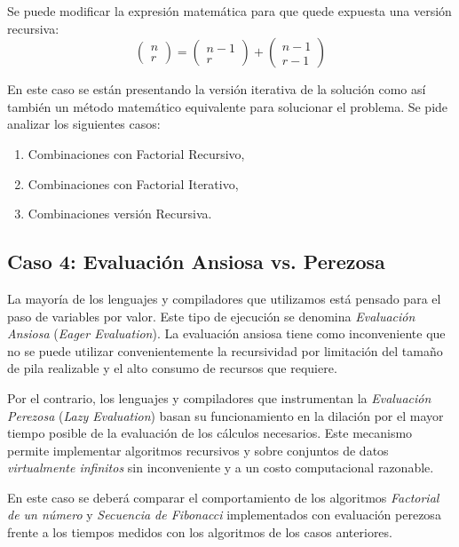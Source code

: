 Se puede modificar la expresión matemática para que quede expuesta una versión
recursiva:
\begin{equation*}
    \begin{pmatrix} n \\ r \end{pmatrix} =
    \begin{pmatrix}
        n - 1 \\ r
    \end{pmatrix} +
    \begin{pmatrix}
        n - 1 \\ r - 1
    \end{pmatrix}
\end{equation*}

En este caso se están presentando la versión iterativa de la solución como
así también un método matemático equivalente para solucionar el problema.
Se pide analizar los siguientes casos:
\begin{enumerate}
    \item Combinaciones con Factorial Recursivo,
    \item Combinaciones con Factorial Iterativo,
    \item Combinaciones versión Recursiva.
\end{enumerate}


\subsection*{Caso 4: Evaluación Ansiosa vs. Perezosa}

La mayoría de los lenguajes y compiladores que utilizamos está pensado para
el paso de variables por valor.  Este tipo de ejecución se denomina
\emph{Evaluación Ansiosa} (\emph{Eager Evaluation}).  La evaluación ansiosa
tiene como inconveniente que no se puede utilizar convenientemente la
recursividad por limitación del tamaño de pila realizable y el alto consumo
de recursos que requiere.

Por el contrario, los lenguajes y compiladores que instrumentan la
\emph{Evaluación Perezosa} (\emph{Lazy Evaluation}) basan su funcionamiento
en la dilación por el mayor tiempo posible de la evaluación de los cálculos
necesarios.  Este mecanismo permite implementar algoritmos recursivos y sobre
conjuntos de datos \emph{virtualmente infinitos} sin inconveniente y a un costo computacional razonable.

En este caso se deberá comparar el comportamiento de los algoritmos
\emph{Factorial de un número} y \emph{Secuencia de Fibonacci} implementados
con evaluación perezosa frente a los tiempos medidos con los algoritmos de
los casos anteriores.

